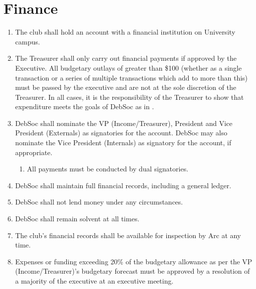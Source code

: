 \newpage
\section{Finance} \label{finances_section}

\begin{enumerate}
\item The club shall hold an account with a financial institution on University campus.
\item The Treasurer shall only carry out financial payments if approved by the Executive. All budgetary outlays of greater than \$100 (whether as a single transaction or a series of multiple transactions which add to more than this) must be passed by the executive and are not at the sole discretion of the Treasurer. In all cases, it is the responsibility of the Treasurer to show that expenditure meets the goals of DebSoc as in .
\item DebSoc shall nominate the VP (Income/Treasurer), President and Vice President (Externals) as signatories for the account. DebSoc may also nominate the Vice President (Internals) as signatory for the account, if appropriate.
\begin{enumerate}
    \item All payments must be conducted by dual signatories.
\end{enumerate}
\item DebSoc shall maintain full financial records, including a general ledger.
\item DebSoc shall not lend money under any circumstances.
\item DebSoc shall remain solvent at all times.
\item The club’s financial records shall be available for inspection by Arc at any time.
\item Expenses or funding exceeding 20\% of the budgetary allowance as per the VP (Income/Treasurer)’s budgetary forecast must be approved by a resolution of a majority of the executive at an executive meeting.
\end{enumerate}
